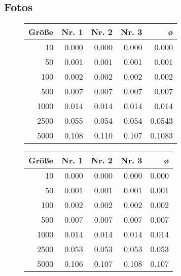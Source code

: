 \documentclass[a4paper, 10pt, twoside, onecolumn, parskip]{scrartcl}
\begin{document}
    \subsection{Fotos} \label{subsec:fotos}

    \begin{figure}[H]
        \begin{minipage}{.45\textwidth}
            \begin{center}
                \begin{tabular}{|r|r|r|r|r|}
                    \hline
                    Größe & Nr. 1 & Nr. 2 & Nr. 3 & ø \\\hline
                    10 & 0.000 & 0.000 & 0.000 & 0.000 \\\hline
                    50 & 0.001 & 0.001 & 0.001 & 0.001 \\\hline
                    100 & 0.002 & 0.002 & 0.002 & 0.002 \\\hline
                    500 & 0.007 & 0.007 & 0.007 & 0.007 \\\hline
                    1000 & 0.014 & 0.014 & 0.014 & 0.014 \\\hline
                    2500 & 0.055 & 0.054 & 0.054 & 0.0543 \\\hline
                    5000 & 0.108 & 0.110 & 0.107 & 0.1083 \\\hline
                \end{tabular}
            \end{center}
        \end{minipage}\hfill%
        \begin{minipage}{.45\textwidth}
            \begin{center}
                \begin{tabular}{|r|r|r|r|r|}
                    \hline
                    Größe & Nr. 1 & Nr. 2 & Nr. 3 & ø \\\hline
                    10 & 0.000 & 0.000 & 0.000 & 0.000 \\\hline
                    50 & 0.001 & 0.001 & 0.001 & 0.001 \\\hline
                    100 & 0.002 & 0.002 & 0.002 & 0.002 \\\hline
                    500 & 0.007 & 0.007 & 0.007 & 0.007 \\\hline
                    1000 & 0.014 & 0.014 & 0.014 & 0.014 \\\hline
                    2500 & 0.053 & 0.053 & 0.053 & 0.053 \\\hline
                    5000 & 0.106 & 0.107 & 0.108 & 0.107 \\\hline
                \end{tabular}
            \end{center}
        \end{minipage}
    \end{figure}
\end{document}
